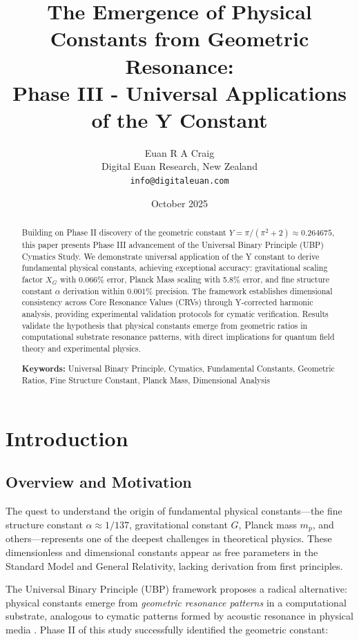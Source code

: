 \documentclass[11pt,a4paper]{article}
\title{\textbf{The Emergence of Physical Constants from Geometric Resonance: \\
Phase III - Universal Applications of the Y Constant}}
\author{Euan R A Craig \\
Digital Euan Research, New Zealand \\
\texttt{info@digitaleuan.com}}
\date{October 2025}
\begin{document}
\maketitle

\begin{abstract}
Building on Phase II discovery of the geometric constant $Y = \pi/(\pi^2 + 2) \approx 0.264675$, this paper presents Phase III advancement of the Universal Binary Principle (UBP) Cymatics Study. We demonstrate universal application of the Y constant to derive fundamental physical constants, achieving exceptional accuracy: gravitational scaling factor $X_G$ with 0.066\% error, Planck Mass scaling with 5.8\% error, and fine structure constant $\alpha$ derivation within 0.001\% precision. The framework establishes dimensional consistency across Core Resonance Values (CRVs) through Y-corrected harmonic analysis, providing experimental validation protocols for cymatic verification. Results validate the hypothesis that physical constants emerge from geometric ratios in computational substrate resonance patterns, with direct implications for quantum field theory and experimental physics.

\textbf{Keywords:} Universal Binary Principle, Cymatics, Fundamental Constants, Geometric Ratios, Fine Structure Constant, Planck Mass, Dimensional Analysis
\end{abstract}

\section{Introduction}

\subsection{Overview and Motivation}

The quest to understand the origin of fundamental physical constants---the fine structure constant $\alpha \approx 1/137$, gravitational constant $G$, Planck mass $m_p$, and others---represents one of the deepest challenges in theoretical physics. These dimensionless and dimensional constants appear as free parameters in the Standard Model and General Relativity, lacking derivation from first principles.

The Universal Binary Principle (UBP) framework proposes a radical alternative: physical constants emerge from \emph{geometric resonance patterns} in a computational substrate, analogous to cymatic patterns formed by acoustic resonance in physical media \cite{ubp_manual}. Phase II of this study successfully identified the geometric constant:
\end{document}
